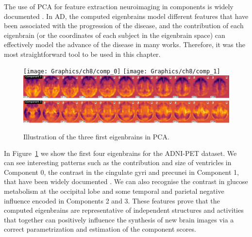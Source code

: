 The use of \ac{PCA} for feature extraction neuroimaging in components is widely documented  \cite{Illan2011,Khedher2015,Martinez-Murcia2016book}. In \ac{AD}, the computed eigenbrains model different features that have been associated with the progression of the disease, and the contribution of each eigenbrain (or the coordinates of each subject in the eigenbrain space) can effectively model the advance of the disease in many works. Therefore, it was the most straightforward tool to be used in this chapter.

\begin{figure}[h]
	\centering
	\texttt{[image: Graphics/ch8/comp\_0]}
	\texttt{[image: Graphics/ch8/comp\_1]}
	\includegraphics[width=0.9\linewidth]{Graphics/ch8/comp_2}
	\includegraphics[width=0.9\linewidth]{Graphics/ch8/comp_3}
	\caption{Illustration of the three first eigenbrains in \acs{PCA}.}
	\label{fig:eigenbrainsSyn}
\end{figure}

In Figure~\ref{fig:eigenbrainsSyn} we show the first four eigenbrains for the ADNI-PET dataset. We can see interesting patterns such as the contribution and size of ventricles in Component 0, the contrast in the cingulate gyri and precunei in Component 1, that have been widely documented \cite{Stoeckel04,Illan2011}. We can also recognise the contrast in glucose metabolism at the occipital lobe and some temporal and parietal negative influence encoded in Components 2 and 3. These features prove that the computed eigenbrains are representative of independent structures and activities that together can positively influence the synthesis of new brain images via a correct parametrization and estimation of the component scores. 



